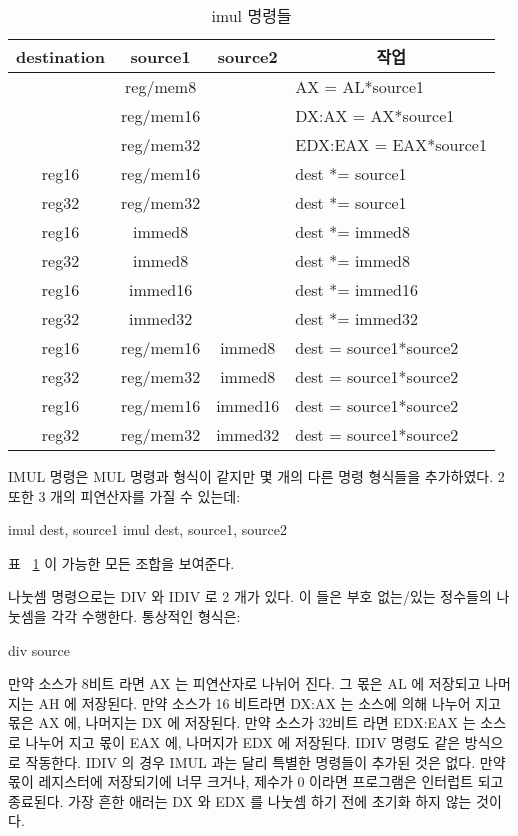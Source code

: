 \begin{table}[t]
\centering
\begin{tabular}{|c|c|c|l|}
\hline
{ \bf destination} & { \bf source1 } & {\bf source2} & \multicolumn{1}{c|}{\bf 작업} \\ \hline
            & reg/mem8        &               & AX = AL*source1 \\
            & reg/mem16       &               & DX:AX = AX*source1 \\
            & reg/mem32       &               & EDX:EAX = EAX*source1 \\
reg16       & reg/mem16       &               & dest *= source1 \\
reg32       & reg/mem32       &               & dest *= source1 \\
reg16       & immed8          &               & dest *= immed8 \\
reg32       & immed8          &               & dest *= immed8 \\
reg16       & immed16         &               & dest *= immed16 \\
reg32       & immed32         &               & dest *= immed32 \\
reg16       & reg/mem16       & immed8        & dest = source1*source2 \\
reg32       & reg/mem32       & immed8        & dest = source1*source2 \\
reg16       & reg/mem16       & immed16       & dest = source1*source2 \\
reg32       & reg/mem32       & immed32       & dest = source1*source2 \\
\hline
\end{tabular}
\caption{{\code imul} 명령들 \label{tab:imul}}
\end{table}

{\code IMUL} 명령은 {\code MUL} 명령과 형식이 같지만 몇 개의 다른 명령 형식들을
추가하였다. 2 또한 3 개의 피연산자를 가질 수 있는데:
\begin{AsmCodeListing}[numbers=none,frame=none]
      imul   dest, source1
      imul   dest, source1, source2
\end{AsmCodeListing}
표 ~\ref{tab:imul} 이 가능한 모든 조합을 보여준다. 

나눗셈 명령으로는 {\code DIV} 와 {\code IDIV} 로 2 개가 있다. 이 들은 
부호 없는/있는 정수들의 나눗셈을 각각 수행한다. 통상적인 형식은:
\begin{AsmCodeListing}[numbers=none,frame=none]
      div   source
\end{AsmCodeListing}
만약 소스가 8비트 라면 AX 는 피연산자로 나뉘어 진다. 그 몫은 AL 에 저장되고
나머지는 AH 에 저장된다. 만약 소스가 16 비트라면 DX:AX 는 소스에 의해
나누어 지고 몫은 AX 에, 나머지는 DX 에 저장된다. 만약 소스가 32비트 라면
EDX:EAX 는 소스로 나누어 지고 몫이 EAX 에, 나머지가
EDX 에 저장된다. {\code IDIV}  명령도 같은 방식으로 작동한다.
{\code IDIV} 의 경우 {\code IMUL} 과는 달리 특별한 명령들이 추가된 것은
없다. 만약 몫이 레지스터에 저장되기에 너무 크거나, 제수가 0 이라면 프로그램은
인터럽트 되고 종료된다. 가장 흔한 애러는 DX 와 EDX 를 나눗셈 하기 전에 초기화 
하지 않는 것이다. 

